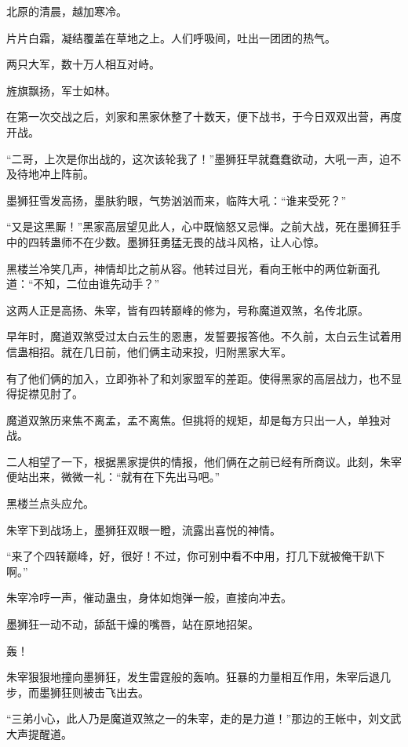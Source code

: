 
\begin{this_body}



北原的清晨，越加寒冷。

片片白霜，凝结覆盖在草地之上。人们呼吸间，吐出一团团的热气。

两只大军，数十万人相互对峙。

旌旗飘扬，军士如林。

在第一次交战之后，刘家和黑家休整了十数天，便下战书，于今日双双出营，再度开战。

“二哥，上次是你出战的，这次该轮我了！”墨狮狂早就蠢蠢欲动，大吼一声，迫不及待地冲上阵前。

墨狮狂雪发高扬，墨肤豹眼，气势汹汹而来，临阵大吼：“谁来受死？”

“又是这黑厮！”黑家高层望见此人，心中既恼怒又忌惮。之前大战，死在墨狮狂手中的四转蛊师不在少数。墨狮狂勇猛无畏的战斗风格，让人心惊。

黑楼兰冷笑几声，神情却比之前从容。他转过目光，看向王帐中的两位新面孔道：“不知，二位由谁先动手？”

这两人正是高扬、朱宰，皆有四转巅峰的修为，号称魔道双煞，名传北原。

早年时，魔道双煞受过太白云生的恩惠，发誓要报答他。不久前，太白云生试着用信蛊相招。就在几日前，他们俩主动来投，归附黑家大军。

有了他们俩的加入，立即弥补了和刘家盟军的差距。使得黑家的高层战力，也不显得捉襟见肘了。

魔道双煞历来焦不离孟，孟不离焦。但挑将的规矩，却是每方只出一人，单独对战。

二人相望了一下，根据黑家提供的情报，他们俩在之前已经有所商议。此刻，朱宰便站出来，微微一礼：“就有在下先出马吧。”

黑楼兰点头应允。

朱宰下到战场上，墨狮狂双眼一瞪，流露出喜悦的神情。

“来了个四转巅峰，好，很好！不过，你可别中看不中用，打几下就被俺干趴下啊。”

朱宰冷哼一声，催动蛊虫，身体如炮弹一般，直接向冲去。

墨狮狂一动不动，舔舐干燥的嘴唇，站在原地招架。

轰！

朱宰狠狠地撞向墨狮狂，发生雷霆般的轰响。狂暴的力量相互作用，朱宰后退几步，而墨狮狂则被击飞出去。

“三弟小心，此人乃是魔道双煞之一的朱宰，走的是力道！”那边的王帐中，刘文武大声提醒道。


\end{this_body}
